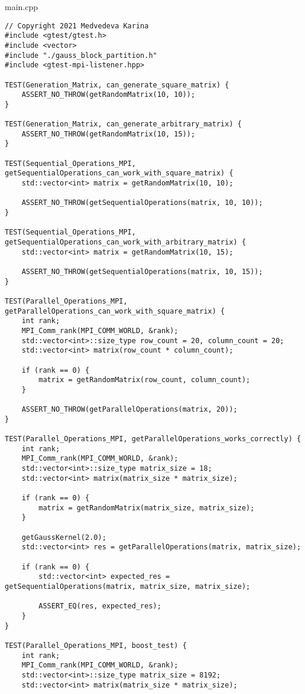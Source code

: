 \documentclass{report}
\begin{document}
main.cpp
\begin{lstlisting}
// Copyright 2021 Medvedeva Karina
#include <gtest/gtest.h>
#include <vector>
#include "./gauss_block_partition.h"
#include <gtest-mpi-listener.hpp>

TEST(Generation_Matrix, can_generate_square_matrix) {
    ASSERT_NO_THROW(getRandomMatrix(10, 10));
}

TEST(Generation_Matrix, can_generate_arbitrary_matrix) {
    ASSERT_NO_THROW(getRandomMatrix(10, 15));
}

TEST(Sequential_Operations_MPI, getSequentialOperations_can_work_with_square_matrix) {
    std::vector<int> matrix = getRandomMatrix(10, 10);

    ASSERT_NO_THROW(getSequentialOperations(matrix, 10, 10));
}

TEST(Sequential_Operations_MPI, getSequentialOperations_can_work_with_arbitrary_matrix) {
    std::vector<int> matrix = getRandomMatrix(10, 15);

    ASSERT_NO_THROW(getSequentialOperations(matrix, 10, 15));
}

TEST(Parallel_Operations_MPI, getParallelOperations_can_work_with_square_matrix) {
    int rank;
    MPI_Comm_rank(MPI_COMM_WORLD, &rank);
    std::vector<int>::size_type row_count = 20, column_count = 20;
    std::vector<int> matrix(row_count * column_count);

    if (rank == 0) {
        matrix = getRandomMatrix(row_count, column_count);
    }

    ASSERT_NO_THROW(getParallelOperations(matrix, 20));
}

TEST(Parallel_Operations_MPI, getParallelOperations_works_correctly) {
    int rank;
    MPI_Comm_rank(MPI_COMM_WORLD, &rank);
    std::vector<int>::size_type matrix_size = 18;
    std::vector<int> matrix(matrix_size * matrix_size);

    if (rank == 0) {
        matrix = getRandomMatrix(matrix_size, matrix_size);
    }

    getGaussKernel(2.0);
    std::vector<int> res = getParallelOperations(matrix, matrix_size);

    if (rank == 0) {
        std::vector<int> expected_res = getSequentialOperations(matrix, matrix_size, matrix_size);

        ASSERT_EQ(res, expected_res);
    }
}

TEST(Parallel_Operations_MPI, boost_test) {
    int rank;
    MPI_Comm_rank(MPI_COMM_WORLD, &rank);
    std::vector<int>::size_type matrix_size = 8192;
    std::vector<int> matrix(matrix_size * matrix_size);


\end{lstlisting}
\end{document}
